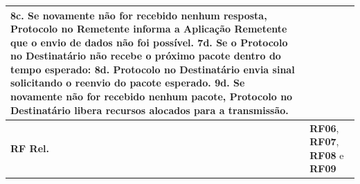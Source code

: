 \begin{longtable}{|p{2.65cm}|p{13cm}|}
    8c. Se novamente não for recebido nenhum resposta, Protocolo no Remetente informa a Aplicação Remetente que o envio de dados não foi possível.
    \newline\newline
    7d. Se o Protocolo no Destinatário não recebe o próximo pacote dentro do tempo esperado: \newline
    8d. Protocolo no Destinatário envia sinal solicitando o reenvio do pacote esperado. \newline
    9d. Se novamente não for recebido nenhum pacote, Protocolo no Destinatário libera recursos alocados para a transmissão. \\
    \hline
    \textbf{RF Rel.} & \textbf{RF06}, \textbf{RF07}, \textbf{RF08} e \textbf{RF09} \\
    \hline
\end{longtable}


